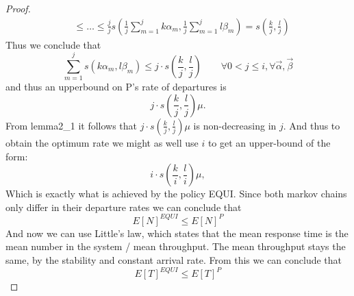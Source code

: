 \begin{proof}
\begin{align*}
    &\leq \dots \leq \frac{j}{j} s(\frac{1}{j}\sum_{m=1}^jk\alpha_m, \frac{1}{j}\sum_{m=1}^j l\beta_m) = s(\frac{k}{j}, \frac{l}{j})
\end{align*}
Thus we conclude that $$\sum_{m=1}^j s(k\alpha_m, l\beta_m) \leq j\cdot s(\frac{k}{j}, \frac{l}{j}) \qquad \forall 0 < j \leq i, \forall \vec{\alpha},\vec{\beta}$$
and thus an upperbound on P's rate of departures is $$j \cdot s \left(\frac{k}{j},\frac{l}{j}\right) \mu.$$ From lemma2_1 it follows that $j\cdot s\left(\frac{k}{j},\frac{l}{j}\right)\mu$ is non-decreasing in $j$. And thus to obtain the optimum rate we might as well use $i$ to get an upper-bound of the form:
$$i\cdot s\left(\frac{k}{i},\frac{l}{i}\right)\mu,$$
Which is exactly what is achieved by the policy EQUI. Since both markov chains only differ in their departure rates we can conclude that
$$E[N]^{EQUI} \leq E[N]^P$$
And now we can use Little's law, which states that the mean response time is the mean number in the system / mean throughput. The mean throughput stays the same, by the stability and constant arrival rate. From this we can conclude that
$$E[T]^{EQUI} \leq E[T]^P$$
\end{proof}
